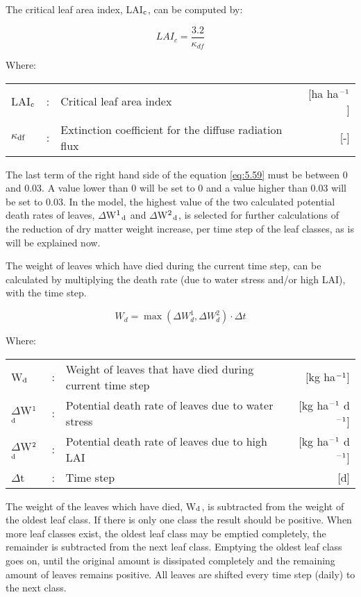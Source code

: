 The critical leaf area index, LAI$_{{\rm c}}$, can be computed by:

\begin{equation}
LAI_{c} = {\frac{3.2}{\kappa_{df} }}
\end{equation}

Where:\\[5pt]
\begin{tabularx}{\textwidth}{llXr}
	LAI$_{{\rm c}}$ &:& Critical leaf area index    &    [ha ha$^{{\rm -1}}$]\\
	$\kappa$$_{{\rm df}}$ &:& Extinction coefficient for 
	the diffuse radiation flux   &    [-]\\
\end{tabularx}

The last term of the right hand side of the equation \ref{eq:5.59} must be between 0 and 0.03. A 
value lower than 0 will be set to 0 and a value higher than 0.03 will be set to 0.03. In the
model, the highest value of the two calculated potential death rates of leaves, 
$\Delta$W$^{{\rm 1}}$$_{{\rm d}}$ and $\Delta$W$^{{\rm 2}}$$_{{\rm d}}$, is selected 
for further calculations of the reduction of dry matter weight increase,
per time step of the leaf classes, as is will be explained now. 

The weight of leaves which have died during the current time step, can be calculated by
multiplying the death rate (due to water stress and/or high LAI), with the time step.

\begin{equation}
W_{d} = \max(\Delta W_{d}^{1} , \Delta W_{d}^{2})\cdot \Delta t
\end{equation}

Where:\\[5pt]
\begin{tabularx}{\textwidth}{llXr}
	W$_{{\rm d}}$ &:& Weight of leaves that have died during 
	current time step    &    [kg ha$^{{\rm -1}}$]\\
	$\Delta$W$^{{\rm 1}}$$_{{\rm d}}$ &:& Potential death rate of leaves due 
	to water stress   &      [kg ha$^{{\rm -1}}$ d$^{{\rm -1}}$]\\
	$\Delta$W$^{{\rm 2}}$$_{{\rm d}}$ &:& Potential death rate of leaves due to 
	high LAI   &     [kg ha$^{{\rm -1}}$ d$^{{\rm -1}}$]\\
	$\Delta$t &:& Time step    &    [d]\\
\end{tabularx}

The weight of the leaves which have died, W$_{{\rm d}}$, is subtracted from the weight of the oldest
leaf class. If there is only one class the result should be positive. When more leaf classes
exist, the oldest leaf class may be emptied completely, the remainder is subtracted from
the next leaf class. Emptying the oldest leaf class goes on, until the original amount is
dissipated completely and the remaining amount of leaves remains positive. All leaves are
shifted every time step (daily) to the next class.

